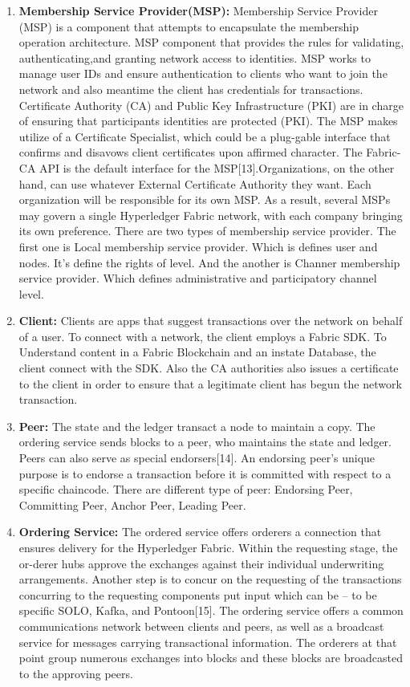 \documentclass[12pt]{ucthesis}
\begin{document}
\begin{enumerate}
 \item  \textbf{Membership Service Provider(MSP):} Membership Service Provider (MSP) is a component that attempts to encapsulate the membership operation architecture. MSP component that provides the rules for validating, authenticating,and granting network access to identities. MSP works to manage user IDs and ensure authentication to clients who want to join the network and also meantime the client has credentials for transactions. Certificate Authority (CA) and Public Key Infrastructure (PKI) are in charge of ensuring that participants identities are protected (PKI). The MSP makes utilize of a Certificate Specialist, which could be a plug-gable interface that confirms and disavows client certificates upon affirmed character. The Fabric-CA API is the default interface for the MSP[13].Organizations, on the other hand, can use whatever External Certificate Authority they want. Each organization will be responsible for its own MSP. As a result, several MSPs may govern a single Hyperledger Fabric network, with each company bringing its own preference. There are two types of membership service provider. The first one is Local membership service provider. Which is defines user and nodes. It’s define the rights of level. And the another is Channer membership service provider. Which defines administrative and participatory channel level.
 
 \item  \textbf{Client:}
 Clients are apps that suggest transactions over the network on behalf of a user. To connect with a network, the client employs a Fabric SDK. To Understand content in a Fabric Blockchain and an instate Database, the client connect with the SDK. Also the CA authorities also issues a certificate to the client in order to ensure that a legitimate client has begun the network transaction. 
 
  \item  \textbf{Peer:}
 The state and the ledger transact a node to maintain a copy. The ordering service sends blocks to a peer, who maintains the state and ledger. Peers can also serve as special endorsers[14]. An endorsing peer’s unique purpose is to endorse a transaction before it is committed with respect to a specific chaincode. There are different type of peer: Endorsing Peer, Committing Peer, Anchor Peer, Leading Peer. 
 \item  \textbf{Ordering Service:}
 The ordered service offers orderers a connection that
 ensures delivery for the Hyperledger Fabric. Within the requesting stage, the or-derer hubs approve the exchanges against their individual underwriting arrangements. Another step is to concur on the requesting of the transactions concurring to the requesting components put input which can be – to be specific SOLO, Kafka, and Pontoon[15]. The ordering service offers a common communications network between clients and peers, as well as a broadcast service for messages carrying transactional information. The orderers at that point group numerous exchanges into blocks and these blocks are broadcasted to the approving peers.
 \vspace{-4mm}
\end{enumerate}
\end{document}
